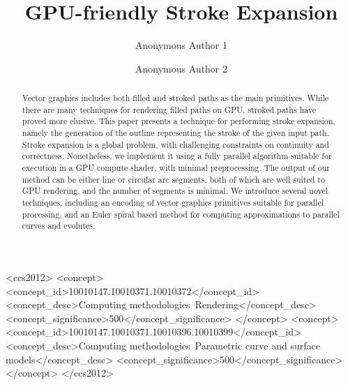 \documentclass[sigconf, nonacm]{acmart}
\begin{document}
\title{GPU-friendly Stroke Expansion}
\author{Anonymous Author 1}
\author{Anonymous Author 2}
\begin{CCSXML}
    <ccs2012>
       <concept>
           <concept_id>10010147.10010371.10010372</concept_id>
           <concept_desc>Computing methodologies~Rendering</concept_desc>
           <concept_significance>500</concept_significance>
           </concept>
       <concept>
           <concept_id>10010147.10010371.10010396.10010399</concept_id>
           <concept_desc>Computing methodologies~Parametric curve and surface models</concept_desc>
           <concept_significance>500</concept_significance>
           </concept>
     </ccs2012>
\end{CCSXML}




\begin{abstract}
    Vector graphics includes both filled and stroked paths as the main primitives. While there are many techniques for rendering filled paths on GPU, stroked paths have proved more elusive. This paper presents a technique for performing stroke expansion, namely the generation of the outline representing the stroke of the given input path. Stroke expansion is a global problem, with challenging constraints on continuity and correctness. Nonetheless, we implement it using a fully parallel algorithm suitable for execution in a GPU compute shader, with minimal preprocessing. The output of our method can be either line or circular arc segments, both of which are well suited to GPU rendering, and the number of segments is minimal. We introduce several novel techniques, including an encoding of vector graphics primitives suitable for parallel processing, and an Euler spiral based method for computing approximations to parallel curves and evolutes.
\end{abstract}

\end{document}
